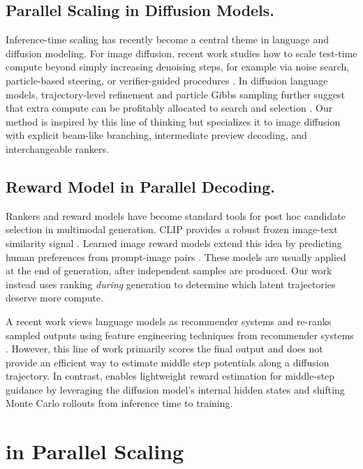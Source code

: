 \documentclass{article}
\newcommand{\method}{\text{Diffusion Ranker}\xspace}
\begin{document}
\subsection{Parallel Scaling in Diffusion Models.}

Inference-time scaling has recently become a central theme in language and diffusion modeling. For image diffusion, recent work studies how to scale test-time compute beyond simply increasing denoising steps, for example via noise search, particle-based steering, or verifier-guided procedures \citep{ma2025inferencetimescaling,singhal2025fk}. In diffusion language models, trajectory-level refinement and particle Gibbs sampling further suggest that extra compute can be profitably allocated to search and selection \citep{zhang2025pgdlm}. Our method is inspired by this line of thinking but specializes it to image diffusion with explicit beam-like branching, intermediate preview decoding, and interchangeable rankers.

\subsection{Reward Model in Parallel Decoding.}

Rankers and reward models have become standard tools for post hoc candidate selection in multimodal generation. CLIP provides a robust frozen image-text similarity signal \citep{radford2021clip}. Learned image reward models extend this idea by predicting human preferences from prompt-image pairs \citep{xu2023imagereward}. These models are usually applied at the end of generation, after independent samples are produced. Our work instead uses ranking \emph{during} generation to determine which latent trajectories deserve more compute.

A recent work views language models as recommender systems and re-ranks sampled outputs using feature engineering techniques from recommender systems \citep{zhang2025recommender}. However, this line of work primarily scores the final output and does not provide an efficient way to estimate middle step potentials along a diffusion trajectory. In contrast, \method enables lightweight reward estimation for middle-step guidance by leveraging the diffusion model's internal hidden states and shifting Monte Carlo rollouts from inference time to training.

\section{\method in Parallel Scaling}
\end{document}
